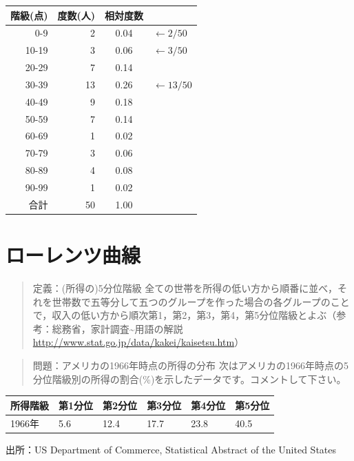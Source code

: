 \documentclass[
]{book}
\theoremstyle{definition}
\theoremstyle{definition}
\theoremstyle{definition}
\theoremstyle{definition}
\theoremstyle{remark}
\begin{document}
\begin{longtable}[]{@{}rrcl@{}}
\toprule()
階級(点) & 度数(人) & 相対度数 & \\
\midrule()
\endhead
0-9 & 2 & 0.04 & \(\leftarrow 2/50\) \\
10-19 & 3 & 0.06 & \(\leftarrow 3/50\) \\
20-29 & 7 & 0.14 & \\
30-39 & 13 & 0.26 & \(\leftarrow 13/50\) \\
40-49 & 9 & 0.18 & \\
50-59 & 7 & 0.14 & \\
60-69 & 1 & 0.02 & \\
70-79 & 3 & 0.06 & \\
80-89 & 4 & 0.08 & \\
90-99 & 1 & 0.02 & \\
合計 & 50 & 1.00 & \\
\bottomrule()
\end{longtable}

\hypertarget{ux30edux30fcux30ecux30f3ux30c4ux66f2ux7dda}{%
\chapter{ローレンツ曲線}\label{ux30edux30fcux30ecux30f3ux30c4ux66f2ux7dda}}

\begin{quote}
定義：(所得の)5分位階級
全ての世帯を所得の低い方から順番に並べ，それを世帯数で五等分して五つのグループを作った場合の各グループのことで，収入の低い方から順次第1，第2，第3，第4，第5分位階級とよぶ（参考：総務省，家計調査\textasciitilde 用語の解説 \url{http://www.stat.go.jp/data/kakei/kaisetsu.htm}）
\end{quote}

\begin{quote}
問題：アメリカの1966年時点の所得の分布
次はアメリカの1966年時点の5分位階級別の所得の割合(\%)を示したデータです。コメントして下さい。
\end{quote}

\begin{longtable}[]{@{}llllll@{}}
\toprule()
所得階級 & 第1分位 & 第2分位 & 第3分位 & 第4分位 & 第5分位 \\
\midrule()
\endhead
1966年 & 5.6 & 12.4 & 17.7 & 23.8 & 40.5 \\
\bottomrule()
\end{longtable}

出所：US Department of Commerce, Statistical Abstract of the United States
\end{document}

